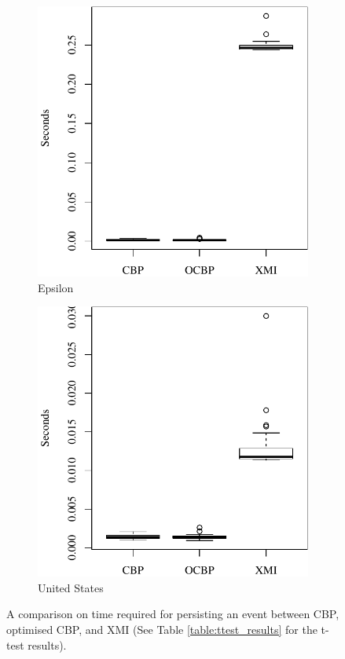 \documentclass{llncs}
\begin{document}
\begin{figure}[ht]
\begin{subfigure}{0.325\textwidth}
    \includegraphics[width=\linewidth]{images/save_time_epsilon}
    \caption{Epsilon}
    \label{fig:save_time_epsilon}
\end{subfigure}
\hfill
\begin{subfigure}{0.325\textwidth}
    \centering
    \includegraphics[width=\linewidth]{images/save_time_wikipedia}
    \caption{United States}
    \label{fig:save_time_wikipedia}
\end{subfigure}
\caption{A comparison on time required for persisting an event between CBP, optimised CBP, and XMI (See Table \ref{table:ttest_results} for the t-test results).}
\label{fig:savetime}
    \end{figure}
    
\end{document}
